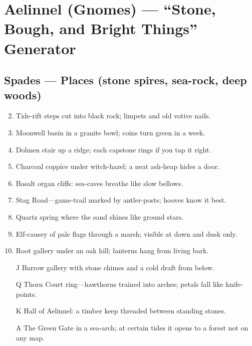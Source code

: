 \chapter{Aelinnel (Gnomes) --- ``Stone, Bough, and Bright Things'' Generator}

\section*{Spades --- Places (stone spires, sea-rock, deep woods)}
\begin{enumerate}
\setcounter{enumi}{1}
\item Tide-rift steps cut into black rock; limpets and old votive nails.
\item Moonwell basin in a granite bowl; coins turn green in a week.
\item Dolmen stair up a ridge; each capstone rings if you tap it right.
\item Charcoal coppice under witch-hazel; a neat ash-heap hides a door.
\item Basalt organ cliffs: sea-caves breathe like slow bellows.
\item Stag Road---game-trail marked by antler-posts; hooves know it best.
\item Quartz spring where the sand shines like ground stars.
\item Elf-causey of pale flags through a marsh; visible at dawn and dusk only.
\item Root gallery under an oak hill; lanterns hang from living bark.
\item[J] Barrow gallery with stone chimes and a cold draft from below.
\item[Q] Thorn Court ring---hawthorns trained into arches; petals fall like knife-points.
\item[K] Hall of Aelinnel: a timber keep threaded between standing stones.
\item[A] The Green Gate in a sea-arch; at certain tides it opens to a forest not on any map.
\end{enumerate}

